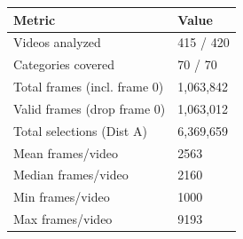 \begin{tabular}{ll}
\toprule
Metric & Value \\
\midrule
Videos analyzed & 415 / 420 \\
Categories covered & 70 / 70 \\
Total frames (incl. frame 0) & 1,063,842 \\
Valid frames (drop frame 0) & 1,063,012 \\
Total selections (Dist A) & 6,369,659 \\
Mean frames/video & 2563 \\
Median frames/video & 2160 \\
Min frames/video & 1000 \\
Max frames/video & 9193 \\
\bottomrule
\end{tabular}
